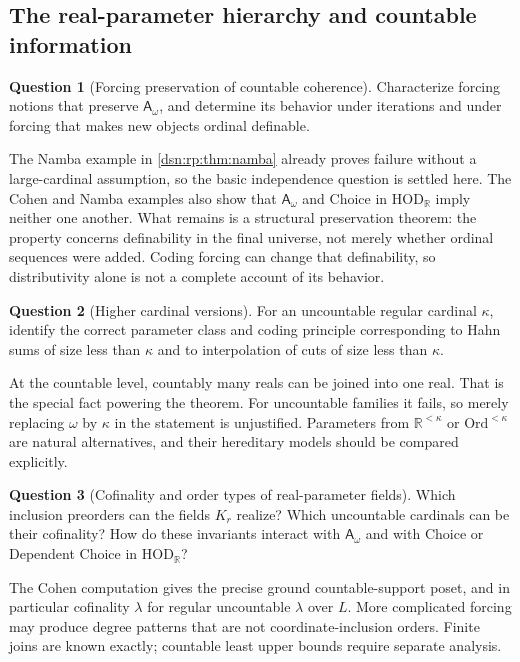 \documentclass[11pt,a4paper]{article}
\numberwithin{equation}{section}
\theoremstyle{definition}
\newtheorem{question}[question]{Question}
\theoremstyle{remark}
\newcommand{\Ord}{\mathrm{Ord}}
\newcommand{\HOD}{\mathrm{HOD}}
\newcommand{\R}{\mathbb R}
\newcommand{\HR}{\HOD_{\R}}
\newcommand{\Asm}{\mathsf A_{\omega}}
\begin{document}
\subsection{The real-parameter hierarchy and countable information}

\begin{question}[Forcing preservation of countable coherence]
Characterize forcing notions that preserve $\Asm$, and determine its
behavior under iterations and under forcing that makes new objects
ordinal definable.
\end{question}
The Namba example in \cref{dsn:rp:thm:namba} already proves failure without
a large-cardinal assumption, so the basic independence question is
settled here. The Cohen and Namba examples also show that $\Asm$ and
Choice in $\HR$ imply neither one another. What remains is a structural
preservation theorem: the property concerns definability in the final
universe, not merely whether ordinal sequences were added. Coding
forcing can change that definability, so distributivity alone is not
a complete account of its behavior.

\begin{question}[Higher cardinal versions]
For an uncountable regular cardinal $\kappa$, identify the correct
parameter class and coding principle corresponding to Hahn sums of
size less than $\kappa$ and to interpolation of cuts of size less than
$\kappa$.
\end{question}
At the countable level, countably many reals can be joined into one
real. That is the special fact powering the theorem. For uncountable
families it fails, so merely replacing $\omega$ by $\kappa$ in the
statement is unjustified. Parameters from $\R^{<\kappa}$ or
$\Ord^{<\kappa}$ are natural alternatives, and their hereditary models
should be compared explicitly.

\begin{question}[Cofinality and order types of real-parameter fields]
Which inclusion preorders can the fields $K_r$ realize? Which
uncountable cardinals can be their cofinality? How do these invariants
interact with $\Asm$ and with Choice or Dependent Choice in $\HR$?
\end{question}
The Cohen computation gives the precise ground countable-support
poset, and in particular cofinality $\lambda$ for regular uncountable
$\lambda$ over $L$. More complicated forcing may produce degree
patterns that are not coordinate-inclusion orders. Finite joins are
known exactly; countable least upper bounds require separate analysis.
\end{document}

